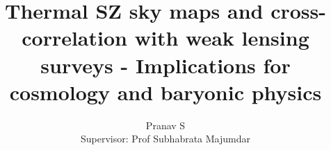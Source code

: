 


\title{Thermal SZ sky maps and cross-correlation with weak lensing surveys - Implications for cosmology and baryonic physics}

\author{Pranav S \\ Supervisor: Prof Subhabrata Majumdar}
\maketitle


\tableofcontents










